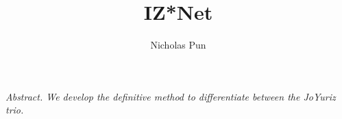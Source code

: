 \documentclass[11pt]{article}
\title{IZ*Net}
\author{Nicholas Pun}
\begin{document}
\maketitle

\vspace{5mm}
\begin{center}
    \it{Abstract.} We develop the definitive method to differentiate between the JoYuriz trio.     
\end{center}
\vspace{5mm}

{\small \tableofcontents}






\clearpage
\begin{appendices}
    
    
\end{appendices}

\clearpage
\nocite{*}


\end{document}
